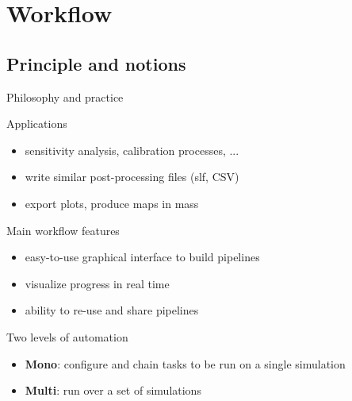 \section{Workflow}

\subsection{Principle and notions}

\begin{frame}{Philosophy and practice}

  \begin{block}{Applications}
    \begin{itemize}
      \item sensitivity analysis, calibration processes, ...
      \item write similar post-processing files (slf, CSV)
      \item export plots, produce maps in mass
    \end{itemize}
  \end{block}
  \pause

  \begin{block}{Main workflow features}
    \begin{itemize}
      \item easy-to-use graphical interface to build pipelines
      \item visualize progress in real time
      \item ability to re-use and share pipelines
    \end{itemize}
  \end{block}
  \pause

  \begin{block}{Two levels of automation}
    \begin{itemize}
      \item \textbf{Mono}: configure and chain tasks to be run on a single simulation
      \item \textbf{Multi}: run over a set of simulations
    \end{itemize}
  \end{block}
\end{frame}


